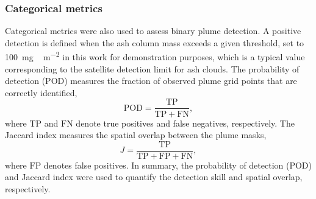 \subsubsection{Categorical metrics}
Categorical metrics were also used to assess binary plume detection. A positive detection is defined when the ash column mass exceeds a given threshold, set to 100~\unit{mg\,m^{-2}} in this work for demonstration purposes, which is a typical value corresponding to the satellite detection limit for ash clouds. The probability of detection (POD) measures the fraction of observed plume grid points that are correctly identified,
\begin{equation}
\mathrm{POD} = \frac{\mathrm{TP}}{\mathrm{TP}+\mathrm{FN}},
\end{equation}
where $\mathrm{TP}$ and $\mathrm{FN}$ denote true positives and false negatives, respectively. The Jaccard index measures the spatial overlap between the plume masks,
\begin{equation}
J = \frac{\mathrm{TP}}{\mathrm{TP}+\mathrm{FP}+\mathrm{FN}},
\end{equation}
where $\mathrm{FP}$ denotes false positives. In summary, the probability of detection (POD) and Jaccard index were used to quantify the detection skill and spatial overlap, respectively.
